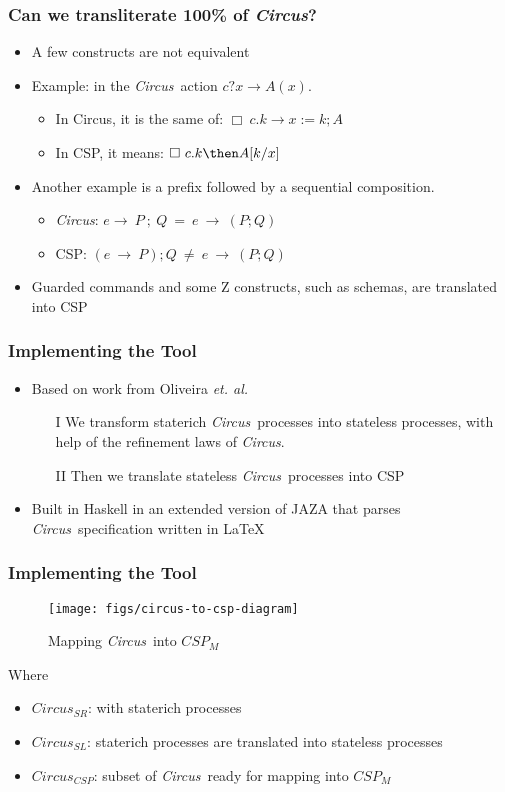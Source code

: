 \documentclass{beamer}
\newcommand{\CSPM}{$CSP_M$}
\def\Circus{{\sf\slshape{Circus}}}
\begin{document}
\begin{frame}
\frametitle{Can we transliterate 100\% of \Circus?}
\begin{itemize}
  \item A few constructs are not equivalent
  \item Example: in the \Circus\ action $c?x \rightarrow A(x)$.
  \begin{itemize}
    \item In Circus, it is the same of: $\Box~c.k \rightarrow x:= k ; A$ 
    \item In CSP, it means: $\Box~c.k \then A[k/x]$
  \end{itemize}
  \item Another example is a prefix followed by a sequential composition.
  \begin{itemize}
    \item \Circus: $e \rightarrow~P~;~Q~=~e~\rightarrow~(P;Q)$
    \item CSP: $(e~\rightarrow~P);Q~\neq~e~\rightarrow~(P;Q)$
  \end{itemize}
  \item Guarded commands and some Z constructs, such as schemas, are translated into CSP
\end{itemize}
\end{frame}

\begin{frame}
\frametitle{Implementing the Tool}
\begin{itemize}
  \item Based on work from Oliveira \emph{et. al.}
  \begin{itemize}
    \item[I] We transform staterich \Circus\ processes into stateless processes, with help of the refinement laws of \Circus.
    \item[II] Then we translate stateless \Circus\ processes into CSP
  \end{itemize}
  \item Built in Haskell in an extended version of JAZA that parses \Circus\ specification written in \LaTeX
  \end{itemize}
\end{frame}

\begin{frame}[fragile]
\frametitle{Implementing the Tool}
\begin{figure}[htbp]
  \centering
    \texttt{[image: figs/circus-to-csp-diagram]}
  \caption{Mapping \Circus\ into \CSPM}
 \end{figure}
 Where
 \begin{itemize}
  \item $Circus_{SR}$: with staterich processes
  \item $Circus_{SL}$: staterich processes are translated into stateless processes
  \item $Circus_{CSP}$: subset of \Circus\ ready for mapping into \CSPM\
\end{itemize}
\end{frame}
\end{document}
